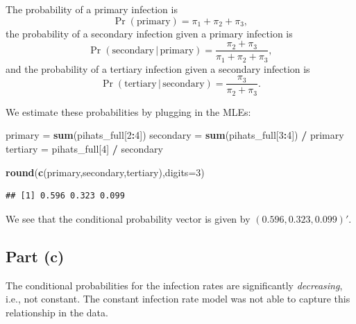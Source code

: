 \documentclass[
]{article}
\newenvironment{Shaded}{\begin{snugshade}}{\end{snugshade}}
\newcommand{\AttributeTok}[1]{\textcolor[rgb]{0.13,0.29,0.53}{#1}}
\newcommand{\DecValTok}[1]{\textcolor[rgb]{0.00,0.00,0.81}{#1}}
\newcommand{\FunctionTok}[1]{\textcolor[rgb]{0.13,0.29,0.53}{\textbf{#1}}}
\newcommand{\NormalTok}[1]{#1}
\newcommand{\OtherTok}[1]{\textcolor[rgb]{0.56,0.35,0.01}{#1}}
\newcommand{\SpecialCharTok}[1]{\textcolor[rgb]{0.81,0.36,0.00}{\textbf{#1}}}
\begin{document}

The probability of a primary infection is \[
  \Pr(\text{primary}) = \pi_1 + \pi_2 + \pi_3,
\] the probability of a secondary infection given a primary infection is
\[
  \Pr(\text{secondary} \,\vert\, \text{primary}) = \frac{\pi_2 + \pi_3}{\pi_1 + \pi_2 + \pi_3},
\] and the probability of a tertiary infection given a secondary
infection is \[
  \Pr(\text{tertiary} \,\vert\, \text{secondary}) = \frac{\pi_3}{\pi_2 + \pi_3}.
\]

We estimate these probabilities by plugging in the MLEs:

\begin{Shaded}
\begin{Highlighting}[]
\NormalTok{primary }\OtherTok{=} \FunctionTok{sum}\NormalTok{(pihats\_full[}\DecValTok{2}\SpecialCharTok{:}\DecValTok{4}\NormalTok{])}
\NormalTok{secondary }\OtherTok{=} \FunctionTok{sum}\NormalTok{(pihats\_full[}\DecValTok{3}\SpecialCharTok{:}\DecValTok{4}\NormalTok{]) }\SpecialCharTok{/}\NormalTok{ primary}
\NormalTok{tertiary }\OtherTok{=}\NormalTok{ pihats\_full[}\DecValTok{4}\NormalTok{] }\SpecialCharTok{/}\NormalTok{ secondary}

\FunctionTok{round}\NormalTok{(}\FunctionTok{c}\NormalTok{(primary,secondary,tertiary),}\AttributeTok{digits=}\DecValTok{3}\NormalTok{)}
\end{Highlighting}
\end{Shaded}

\begin{verbatim}
## [1] 0.596 0.323 0.099
\end{verbatim}

We see that the conditional probability vector is given by
\((0.596,0.323,0.099)'\).

\hypertarget{part-c}{%
\subsection{Part (c)}\label{part-c}}


The conditional probabilities for the infection rates are significantly
\emph{decreasing}, i.e., not constant. The constant infection rate model
was not able to capture this relationship in the data.
\end{document}
